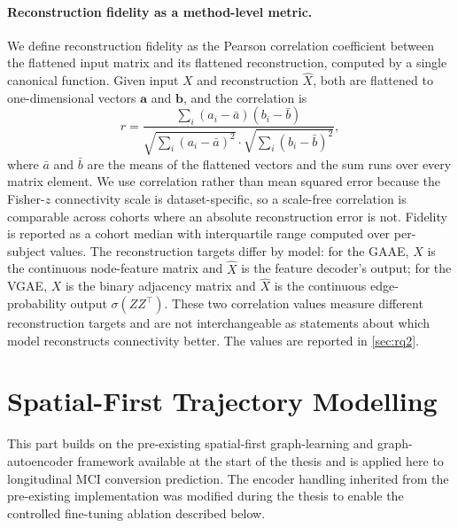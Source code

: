 \paragraph{Reconstruction fidelity as a method-level metric.}
We define reconstruction fidelity as the Pearson correlation coefficient between the
flattened input matrix and its flattened reconstruction, computed by a single canonical
function. Given input
$X$ and reconstruction $\hat{X}$, both are flattened to one-dimensional vectors
$\mathbf{a}$ and $\mathbf{b}$, and the correlation is
\begin{equation}
  r = \frac{\sum_i (a_i - \bar{a})(b_i - \bar{b})}
           {\sqrt{\sum_i (a_i - \bar{a})^2}
            \cdot \sqrt{\sum_i (b_i - \bar{b})^2}},
  \label{eq:pearson-r}
\end{equation}
where $\bar{a}$ and $\bar{b}$ are the means of the flattened vectors and the sum runs over
every matrix element. We use correlation rather than mean squared error because the
Fisher-$z$ connectivity scale is dataset-specific, so a scale-free correlation is
comparable across cohorts where an absolute reconstruction error is not. Fidelity is
reported as a cohort median with interquartile range computed over per-subject values. The
reconstruction targets differ by model: for the \ac{GAAE}, $X$ is the continuous
node-feature matrix and $\hat{X}$ is the feature decoder's output; for the \ac{VGAE},
$X$ is the binary adjacency matrix and $\hat{X}$ is the continuous edge-probability output
$\sigma(ZZ^\top)$. These two correlation values measure different reconstruction targets
and are not interchangeable as statements about which model reconstructs connectivity
better. The values are reported in \autoref{sec:rq2}.

\section{Spatial-First Trajectory Modelling}\label{sec:spatial-first}

This part builds on the pre-existing spatial-first graph-learning and graph-autoencoder
framework available at the start of the thesis and is applied here to longitudinal \ac{MCI}
conversion prediction. The encoder handling inherited from the pre-existing implementation
was modified during the thesis to enable the controlled fine-tuning ablation described
below.

